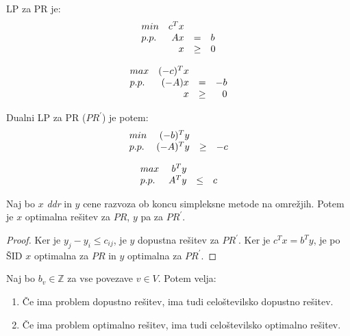 \documentclass[11pt, a4paper]{article}
\begin{document}
    LP za PR je:
    \[
        \begin{array}{l r c l}
            min & c^T x \\
            p.p. & Ax & = & b \\
            & x & \ge & 0
        \end{array}    
    \]
    
    \[
        \begin{array}{l r c r}
            max & (-c)^T x \\
            p.p. & (-A)x & = & -b \\
            & x & \ge & 0
        \end{array}    
    \]

    Dualni LP za PR (\(PR^\prime\)) je potem:
    \[
        \begin{array}{l r c r}
            min & (-b)^T y \\
            p.p. & (-A)^T y & \ge & -c \\
        \end{array}    
    \]
    
    \[
        \begin{array}{l r c r}
            max & b^T y \\
            p.p. & A^T y & \le & c \\
        \end{array}    
    \]

    \begin{theorem}
        Naj bo \(x\) \textit{ddr} in \(y\) cene razvoza ob koncu simpleksne metode na omrežjih. Potem je \(x\) optimalna rešitev za \(PR\), \(y\) pa za \(PR^\prime\).
    \end{theorem}


    \begin{proof}
        Ker je \(y_j - y_i \le c_{ij}\), je \(y\) dopustna rešitev za \(PR^\prime\). Ker je \(c^T x = b^T y\), je po ŠID \(x\) optimalna za \(PR\) in \(y\) optimalna za \(PR^\prime\).
    \end{proof}

    \begin{theorem}
        Naj bo \(b_v \in \mathbb{Z}\) za vse povezave \(v \in V\). Potem velja:
        \begin{enumerate}[label=(\alph*)]
            \item Če ima problem dopustno rešitev, ima tudi celoštevilsko dopustno rešitev.
            \item Če ima problem optimalno rešitev, ima tudi celoštevilsko optimalno rešitev.
        \end{enumerate}
    \end{theorem}
\end{document}
